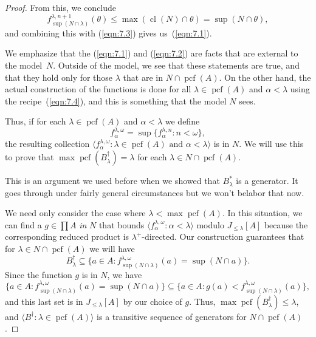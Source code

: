 \documentclass[10pt]{amsart}
\theoremstyle{plain}
\theoremstyle{definition}
\theoremstyle{remark}
\DeclareMathOperator{\cl}{cl}
\DeclareMathOperator{\pcf}{pcf}
\numberwithin{equation}{section}
\begin{document}
\begin{proof}
From this, we conclude
\begin{equation}
f^{\lambda, n+1}_{\sup(N\cap\lambda)}(\theta)\leq\max(\cl(N)\cap\theta)=\sup(N\cap\theta),
\end{equation}
and combining this with (\ref{eqn:7.3}) gives us~(\ref{eqn:7.1}).


We emphasize that the (\ref{eqn:7.1}) and (\ref{eqn:7.2}) are facts that are external to the model~$N$. Outside of the model, we
see that these statements are true,  and that they hold only for those $\lambda$ that are in $N\cap\pcf(A)$.
On the other hand, the actual construction of the functions is done for all $\lambda\in\pcf(A)$ and $\alpha<\lambda$ using the recipe~(\ref{eqn:7.4}),
and this is something that the model $N$ sees.


Thus, if for each $\lambda\in\pcf(A)$ and $\alpha<\lambda$ we define
\begin{equation}
f^{\lambda,\omega}_\alpha = \sup\{f^{\lambda, n}_\alpha:n<\omega\},
\end{equation}
the resulting collection $\langle f^{\lambda,\omega}_\alpha:\lambda\in \pcf(A)\text{ and }\alpha<\lambda\rangle$ is in $N$.
We will use this to prove that $\max\pcf(B^\dagger_\lambda)=\lambda$ for each $\lambda\in N\cap\pcf(A)$.


This is an argument we used before when we showed that $B^*_\lambda$ is a generator.  It goes through under fairly general circumstances
but we won't belabor that now.

We need only consider the case where $\lambda<\max\pcf(A)$. In this situation, we can find a $g\in\prod A$ {\em in } $N$ that bounds
$\langle f^{\lambda,\omega}_\alpha:\alpha<\lambda\rangle$ modulo $J_{\leq\lambda}[A]$ because the corresponding reduced product is
$\lambda^+$-directed.
Our construction guarantees that for $\lambda\in N\cap\pcf(A)$ we will have
\begin{equation}
B^\dagger_\lambda\subseteq\{ a\in A: f^{\lambda,\omega}_{\sup(N\cap\lambda)}(a) = \sup(N\cap a)\}.
\end{equation}
Since the function $g$ is in $N$, we have
\begin{equation}
\{a\in A: f^{\lambda,\omega}_{\sup(N\cap\lambda)}(a) = \sup(N\cap a)\}\subseteq \{a\in A: g(a)<
 f^{\lambda,\omega}_{\sup(N\cap\lambda)}(a)\},
\end{equation}
and this last set is in $J_{\leq\lambda}[A]$ by our choice of $g$.
Thus, $\max\pcf(B^\dagger_\lambda)\leq\lambda$, and $\langle B^\dagger:\lambda\in\pcf(A)\rangle$ is a transitive sequence
of generators for $N\cap\pcf(A)$.


\end{proof}
\end{document}
